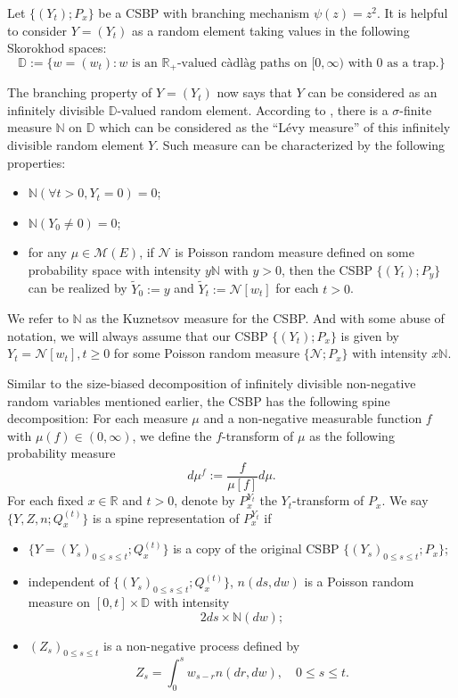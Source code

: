 \documentclass[UTF8]{pkuthss}
\theoremstyle{plain}
\theoremstyle{definition}
\numberwithin{equation}{section}
\begin{document}
	Let $\{(Y_t);P_x\}$ be a CSBP with branching mechanism $\psi(z)=z^2$.
It is helpful to consider $Y=(Y_t)$ as a random element taking values in the following Skorokhod spaces:
\[
\mathbb D:=\{w=(w_t): w \text{ is an $\mathbb R_+$-valued c\`adl\`ag paths on $[0,\infty)$ with $0$ as a trap.}\}
\]

	The branching property of $Y=(Y_t)$ now says that $Y$ can be considered as an infinitely divisible $\mathbb D$-valued random element. 
	According to \cite{DynkinKuznetsov2004N-measure}, there is a $\sigma$-finite measure $\mathbb N$ on $\mathbb D$ which can be considered as the ``L\'evy measure'' of this infinitely divisible random element $Y$. Such measure can be characterized by the following properties:
\begin{itemize}
\item
 	$\mathbb N(\forall t>0, Y_t = 0) = 0$;
\item
	$\mathbb N(Y_0\neq 0)=0$;
\item
	for any $\mu\in \mathcal M(E)$, if $\mathcal N$ is Poisson random measure defined on some probability space with intensity $y\mathbb N$ with $y>0$, then the CSBP $\{(Y_t);P_y\}$ can be realized by $\tilde Y_0 := y$ and $\tilde Y_t:= \mathcal N[w_t]$ for each $t>0$.
\end{itemize}
	We refer to $\mathbb N$ as the Kuznetsov measure for the CSBP. 
	And with some abuse of notation, we will always assume that our CSBP $\{(Y_t); P_x\}$ is given by $Y_t = \mathcal N[w_t], t\geq 0$ for some Poisson random measure $\{\mathcal N;P_x\}$ with intensity $x\mathbb N$.

	Similar to the size-biased decomposition of infinitely divisible non-negative random variables mentioned earlier, the CSBP has the following spine decomposition:
	For each measure $\mu$ and a non-negative measurable function $f$ with $\mu(f) \in (0,\infty)$, we define the $f$-transform of $\mu$ as the following probability measure
\[
	d\mu^f:= \frac{f}{\mu[f]} d\mu.
\]
	For each fixed $x\in \mathbb R$ and $t>0$, denote by $P_x^{Y_t}$ the $Y_t$-transform of $P_x$. We say $\{Y,Z,n; Q^{(t)}_x\}$ is a spine representation of $P_x^{Y_t}$ if
\begin{itemize}
\item
	$\{Y=(Y_s)_{0\leq s\leq t}; Q^{(t)}_x\}$ is a copy of the original CSBP $\{(Y_s)_{0\leq s\leq t}; P_x\}$;
\item
	independent of $\{(Y_s)_{0\leq s\leq t}; Q_x^{(t)}\}$, $n(ds,dw)$ is a Poisson random measure on $[0,t]\times \mathbb D$ with intensity
\[
	2ds\times \mathbb N(dw);
\]
\item
	$(Z_s)_{0\leq s\leq t}$ is a non-negative process defined by
\begin{equation}
\label{eq: immigrates for classical spine decomposition for CSBP}
	Z_s = \int_0^s w_{s-r} n(dr,dw),\quad 0\leq s\leq t.
\end{equation}
\end{itemize}
\end{document}
